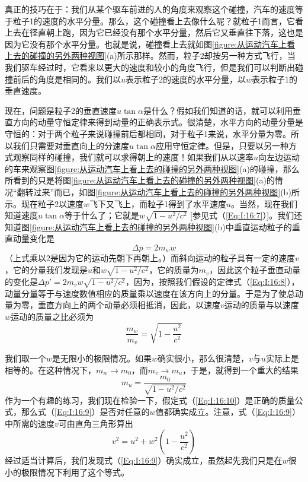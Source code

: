 真正的技巧在于：我们从某个驱车前进的人的角度来观察这个碰撞，汽车的速度等于粒子1的速度的水平分量。那么，这个碰撞看上去像什么呢？就粒子1而言，它看上去在径直朝上跑，因为它已经没有那个水平分量，然后它又垂直往下落，这也是因为它没有那个水平分量。也就是说，碰撞看上去就如图\ref{figure:从运动汽车上看上去的碰撞的另外两种视图}(a)所示那样。然而，粒子2却按另一种方式飞行，当我们驱车经过时，它看来以更大的速度和较小的角度飞行，但是我们可以判断出碰撞前后的角度是相同的。我们以$u$表示粒子2的速度的水平分量，以$w$表示粒子1的垂直速度。

现在，问题是粒子2的垂直速度$u\tan\alpha$是什么？假如我们知道的话，就可以利用垂直方向的动量守恒定律来得到动量的正确表示式。很清楚，水平方向的动量分量是守恒的：对于两个粒子来说碰撞前后都相同，对于粒子1来说，水平分量为零。所以我们只需要对垂直向上的分速度$u\tan\alpha$应用守恒定律。但是，只要以另一种方式观察同样的碰撞，我们就可以求得朝上的速度！如果我们从以速率$u$向左边运动的车来观察图\ref{figure:从运动汽车上看上去的碰撞的另外两种视图}(a)的碰撞，那么所看到的只是将图\ref{figure:从运动汽车上看上去的碰撞的另外两种视图}(a)的情况“翻转过来”而已，如图\ref{figure:从运动汽车上看上去的碰撞的另外两种视图}(b)所示。现在粒子2以速度$w$飞下又飞上，而粒子1得到了水平速度$u$。当然，现在我们知道速度$u\tan\alpha$等于什么了；它就是$w\sqrt{1-u^2/c^2}$ [参见式（\ref{Eq:I:16:7}）]。我们还知道图\ref{figure:从运动汽车上看上去的碰撞的另外两种视图}(b)中垂直运动粒子的垂直动量变化是
\begin{equation*}
    \Delta p = 2m_w w
\end{equation*}
（上式乘以2是因为它的运动先朝下再朝上。）而斜向运动的粒子具有一定的速度$v$，它的分量我们发现是$u$和$w\sqrt{1-u^2/c^2}$，它的质量为$m_v$，因此这个粒子垂直动量的变化是$\Delta p'=2m_vw\sqrt{1-u^2/c^2}$，因为，按照我们假设的定律式（\ref{Eq:I:16:8}），动量分量等于与速度数值相应的质量乘以速度在该方向上的分量。于是为了使总动量为零，垂直方向上的两个动量必须相抵消，因此，以速度$v$运动的质量与以速度$w$运动的质量之比必须为
\begin{equation}
    \label{Eq:I:16:9}
    \frac{m_w}{m_v}=\sqrt{1-\frac{u^2}{c^2}}
\end{equation}

我们取一个$w$是无限小的极限情况。如果$w$确实很小，那么很清楚，$v$与$u$实际上是相等的。在这种情况下，$m_w \to m_0$，而$m_v \to m_u$，于是，就得到一个重大的结果
\begin{equation}
    \label{Eq:I:16:10}
    m_u=\frac{m_0}{\sqrt{1-u^2/c^2}}
\end{equation}
作为一个有趣的练习，我们现在检验一下，假定式（\ref{Eq:I:16:10}）是正确的质量公式，那么式（\ref{Eq:I:16:9}）是否对任意的$w$值都确实成立。注意，式（\ref{Eq:I:16:9}）中所需的速度$v$可由直角三角形算出
\begin{equation*}
    v^2=u^2+w^2(1-\frac{u^2}{c^2})
\end{equation*}
经过适当计算后，我们发现式（\ref{Eq:I:16:9}）确实成立，虽然起先我们只是在$w$很小的极限情况下利用了这个等式。

